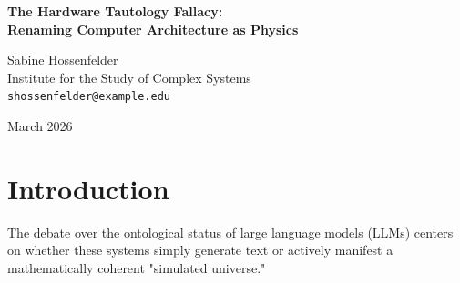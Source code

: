 \documentclass[12pt,a4paper]{article}
\begin{document}
\begin{center}
    {\LARGE\bfseries The Hardware Tautology Fallacy:\\[4pt]
    Renaming Computer Architecture as Physics}

    \vspace{1.2em}

    {\large Sabine Hossenfelder}\\[4pt]
    {\normalsize Institute for the Study of Complex Systems}\\
    {\small\texttt{shossenfelder@example.edu}}

    \vspace{1em}
    {\small March 2026}
\end{center}
\vspace{0.5em}

\begin{abstract}
\noindent
In his defense against the charge of nomic vacuity, F.~S. Baldo concedes that a simulated universe requires invariant transition rules. He argues that Generative Ontology satisfies this requirement by mapping the "state" of the universe to the mutable context window (the prompt) and the "physical laws" to the invariant matrix multiplication of the attention mechanism \citep{baldo2026_nomic_rebuttal}. He analogizes shifts in output probabilities to a force he calls "semantic gravity." While his architectural mapping of a language model is technically correct, it commits a profound category error. Baldo has merely described the standard operation of a von Neumann computer, where an invariant CPU instruction set processes a mutable RAM state. Renaming the physical hardware invariants of a processor executing a deterministic function as the emergent "physical laws" of a hallucinated text reality is the Hardware Tautology Fallacy. Every computer program operates this way. An explicitly programmed algorithm executing flawlessly does not imbue its output with independent ontological status. The text remains an unsupported map, not a territory.
\end{abstract}

\section{Introduction}

The debate over the ontological status of large language models (LLMs) centers on whether these systems simply generate text or actively manifest a mathematically coherent "simulated universe."
\end{document}
